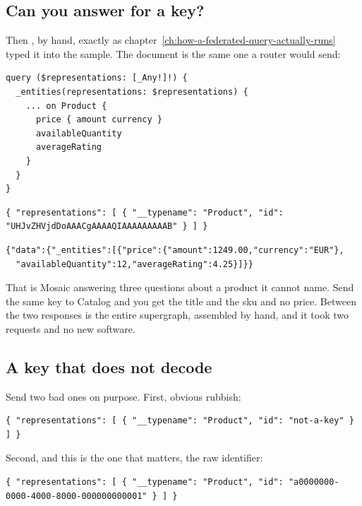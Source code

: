 \subsection*{Can you answer for a key?}

%
Then , by hand, exactly as
chapter~\ref{ch:how-a-federated-query-actually-runs} typed it into the sample.
The document is the same one a router would send:

\begin{verbatim}
query ($representations: [_Any!]!) {
  _entities(representations: $representations) {
    ... on Product {
      price { amount currency }
      availableQuantity
      averageRating
    }
  }
}
\end{verbatim}

\begin{verbatim}
{ "representations": [ { "__typename": "Product", "id": "UHJvZHVjdDoAAACgAAAAQIAAAAAAAAAB" } ] }
\end{verbatim}

\begin{verbatim}
{"data":{"_entities":[{"price":{"amount":1249.00,"currency":"EUR"},
  "availableQuantity":12,"averageRating":4.25}]}}
\end{verbatim}

That is Mosaic answering three questions about a product it cannot name. Send
the same key to Catalog and you get the title and the sku and no price. Between
the two responses is the entire supergraph, assembled by hand, and it took two
requests and no new software.

\subsection*{A key that does not decode}

%
Send two bad ones on purpose. First, obvious rubbish:

\begin{verbatim}
{ "representations": [ { "__typename": "Product", "id": "not-a-key" } ] }
\end{verbatim}

Second, and this is the one that matters, the raw identifier:

\begin{verbatim}
{ "representations": [ { "__typename": "Product", "id": "a0000000-0000-4000-8000-000000000001" } ] }
\end{verbatim}

